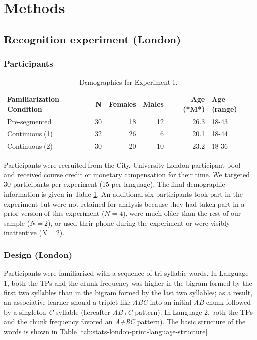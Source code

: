 \documentclass[]{article}
\begin{document}
\clearpage

\section{Methods}\label{methods}

\subsection{Recognition experiment
(London)}\label{recognition-experiment-london}

\subsubsection{Participants}\label{participants}

\begin{table}

\caption{\label{tab:stats-london-demographics-print}Demographics for Experiment 1.}
\centering
\begin{tabular}[t]{lrrrrl}
\toprule
Familiarization Condition & N & Females & Males & Age (*M*) & Age (range)\\
\midrule
Pre-segmented & 30 & 18 & 12 & 26.3 & 18-43\\
Continuous (1) & 32 & 26 & 6 & 20.1 & 18-44\\
Continuous (2) & 30 & 20 & 10 & 23.2 & 18-36\\
\bottomrule
\end{tabular}
\end{table}

Participants were recruited from the City, University London participant
pool and received course credit or monetary compensation for their time.
We targeted 30 participants per experiment (15 per language). The final
demographic information is given in Table
\ref{tab:stats-london-demographics-print}. An additional six
participants took part in the experiment but were not retained for
analysis because they had taken part in a prior version of this
experiment (\(N = 4\)), were much older than the rest of our sample
(\(N = 2\)), or used their phone during the experiment or were visibly
inattentive (\(N = 2\)).

\subsubsection{Design (London)}\label{design-london}

Participants were familiarized with a sequence of tri-syllabic words. In
Language 1, both the TPs and the chunk frequency was higher in the
bigram formed by the first two syllables than in the bigram formed by
the last two syllables; as a result, an associative learner should a
triplet like \emph{ABC} into an initial \emph{AB} chunk followed by a
singleton \emph{C} syllable (hereafter \emph{AB+C} pattern). In Language
2, both the TPs and the chunk frequency favored an \emph{A+BC} pattern).
The basic structure of the words is shown in Table
\ref{tab:stats-london-print-language-structure}
\end{document}
